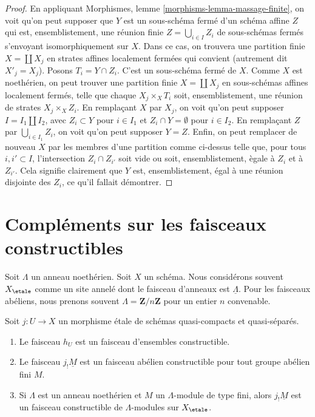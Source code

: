 \begin{proof}
\medskip\noindent
En appliquant Morphismes, lemme \ref{morphisms-lemma-massage-finite},
on voit qu'on peut supposer que $Y$ est un sous-sch\'ema ferm\'e d'un
sch\'ema affine $Z$ qui est, ensemblistement, une r\'eunion finie
$Z = \bigcup_{i \in I} Z_i$ de sous-sch\'emas ferm\'es s'envoyant isomorphiquement
sur $X$. Dans ce cas, on trouvera une partition finie $X = \coprod X_j$
en strates affines localement ferm\'ees qui convient (autrement dit $X'_j = X_j$).
Posons $T_i = Y \cap Z_i$. C'est un sous-sch\'ema ferm\'e de $X$.
Comme $X$ est noeth\'erien, on peut trouver une partition finie $X = \coprod X_j$
en sous-sch\'emas affines localement ferm\'es, telle que chaque
$X_j \times_X T_i$ soit, ensemblistement, une r\'eunion de strates $X_j \times_X Z_i$.
En rempla\c cant $X$ par $X_j$, on voit qu'on peut supposer $I = I_1 \amalg I_2$,
avec $Z_i \subset Y$ pour $i \in I_1$ et $Z_i \cap Y = \emptyset$ pour
$i \in I_2$. En rempla\c cant $Z$ par $\bigcup_{i \in I_1} Z_i$, on voit qu'on
peut supposer $Y = Z$.
Enfin, on peut remplacer de nouveau $X$ par les membres d'une partition
comme ci-dessus telle que, pour tous $i, i' \subset I$, l'intersection
$Z_i \cap Z_{i'}$ soit vide ou soit, ensemblistement, \`egale
\`a $Z_i$ et \`a $Z_{i'}$. Cela signifie clairement que $Y$ est, ensemblistement,
\'egal \`a une r\'eunion disjointe des $Z_i$, ce qu'il fallait d\'emontrer.
\end{proof}








\section{Compl\'ements sur les faisceaux constructibles}
\label{section-more-constructible}

\noindent
Soit $\Lambda$ un anneau noeth\'erien. Soit $X$ un sch\'ema.
Nous consid\'erons souvent $X_\etale$ comme un site annel\'e dont le
faisceau d'anneaux est $\underline{\Lambda}$. Pour les faisceaux ab\'eliens,
nous prenons souvent $\Lambda = \mathbf{Z}/n\mathbf{Z}$ pour un
entier $n$ convenable.

\begin{lemma}
\label{lemma-jshriek-constructible}
Soit $j : U \to X$ un morphisme \'etale de sch\'emas quasi-compacts et
quasi-s\'epar\'es.
\begin{enumerate}
\item Le faisceau $h_U$ est un faisceau d'ensembles constructible.
\item Le faisceau $j_!\underline{M}$ est un faisceau ab\'elien constructible
pour tout groupe ab\'elien fini $M$.
\item Si $\Lambda$ est un anneau noeth\'erien et $M$ un $\Lambda$-module de type fini,
alors $j_!\underline{M}$ est un faisceau constructible de $\Lambda$-modules
sur $X_\etale$.
\end{enumerate}
\end{lemma}


